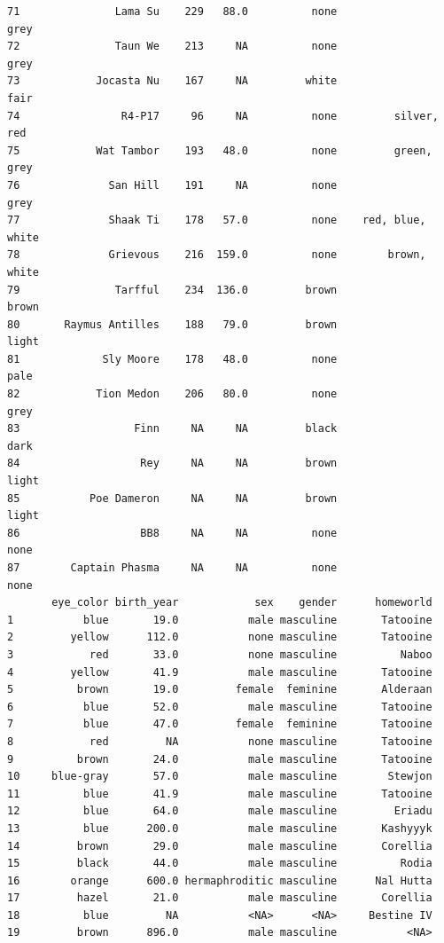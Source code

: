 \documentclass[
]{article}
\begin{document}
\begin{verbatim}
71               Lama Su    229   88.0          none                grey
72               Taun We    213     NA          none                grey
73            Jocasta Nu    167     NA         white                fair
74                R4-P17     96     NA          none         silver, red
75            Wat Tambor    193   48.0          none         green, grey
76              San Hill    191     NA          none                grey
77              Shaak Ti    178   57.0          none    red, blue, white
78              Grievous    216  159.0          none        brown, white
79               Tarfful    234  136.0         brown               brown
80       Raymus Antilles    188   79.0         brown               light
81             Sly Moore    178   48.0          none                pale
82            Tion Medon    206   80.0          none                grey
83                  Finn     NA     NA         black                dark
84                   Rey     NA     NA         brown               light
85           Poe Dameron     NA     NA         brown               light
86                   BB8     NA     NA          none                none
87        Captain Phasma     NA     NA          none                none
       eye_color birth_year            sex    gender      homeworld
1           blue       19.0           male masculine       Tatooine
2         yellow      112.0           none masculine       Tatooine
3            red       33.0           none masculine          Naboo
4         yellow       41.9           male masculine       Tatooine
5          brown       19.0         female  feminine       Alderaan
6           blue       52.0           male masculine       Tatooine
7           blue       47.0         female  feminine       Tatooine
8            red         NA           none masculine       Tatooine
9          brown       24.0           male masculine       Tatooine
10     blue-gray       57.0           male masculine        Stewjon
11          blue       41.9           male masculine       Tatooine
12          blue       64.0           male masculine         Eriadu
13          blue      200.0           male masculine       Kashyyyk
14         brown       29.0           male masculine       Corellia
15         black       44.0           male masculine          Rodia
16        orange      600.0 hermaphroditic masculine      Nal Hutta
17         hazel       21.0           male masculine       Corellia
18          blue         NA           <NA>      <NA>     Bestine IV
19         brown      896.0           male masculine           <NA>

\end{verbatim}
\end{document}
